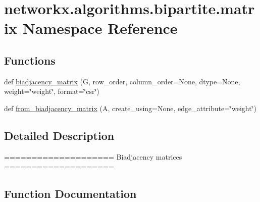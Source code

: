 \hypertarget{namespacenetworkx_1_1algorithms_1_1bipartite_1_1matrix}{}\section{networkx.\+algorithms.\+bipartite.\+matrix Namespace Reference}
\label{namespacenetworkx_1_1algorithms_1_1bipartite_1_1matrix}
\subsection*{Functions}
\begin{DoxyCompactItemize}
\item 
def \hyperlink{namespacenetworkx_1_1algorithms_1_1bipartite_1_1matrix_a9efc70bdc189080905cf62e889941800}{biadjacency\+\_\+matrix} (G, row\+\_\+order, column\+\_\+order=None, dtype=None, weight=\char`\"{}weight\char`\"{}, format=\char`\"{}csr\char`\"{})
\item 
def \hyperlink{namespacenetworkx_1_1algorithms_1_1bipartite_1_1matrix_adf67c12e67a9fa4ea37e823947ed3ddd}{from\+\_\+biadjacency\+\_\+matrix} (A, create\+\_\+using=None, edge\+\_\+attribute=\char`\"{}weight\char`\"{})
\end{DoxyCompactItemize}


\subsection{Detailed Description}
\begin{DoxyVerb}====================
Biadjacency matrices
====================
\end{DoxyVerb}
 

\subsection{Function Documentation}
\mbox{\label{namespacenetworkx_1_1algorithms_1_1bipartite_1_1matrix_a9efc70bdc189080905cf62e889941800}} 

